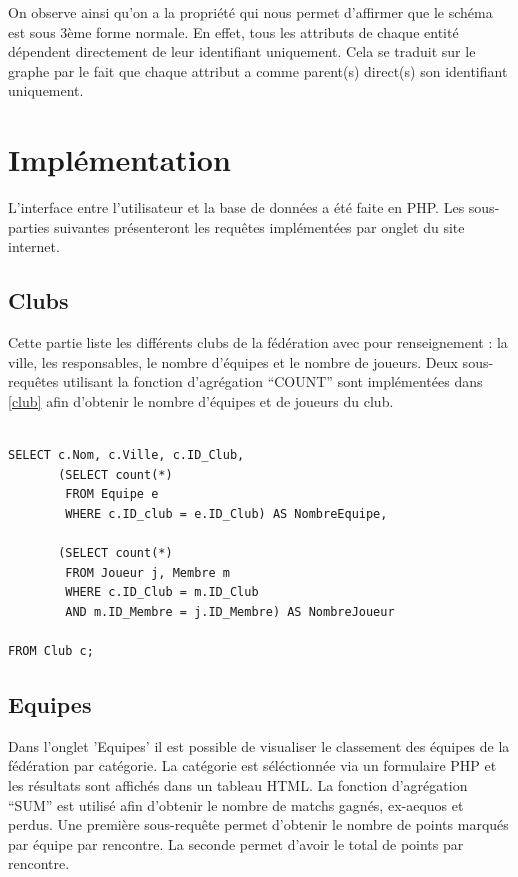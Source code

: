 \documentclass[a4paper»,8pt,french,fleqn]{report}
\begin{document}
On observe ainsi qu'on a la propriété qui nous permet d'affirmer que le schéma est sous 3ème forme normale. En effet, tous les attributs de chaque entité dépendent directement de leur identifiant uniquement. Cela se traduit sur le graphe par le fait que chaque attribut a comme parent(s) direct(s) son identifiant uniquement.

\chapter{Implémentation}

L'interface entre l'utilisateur et la base de données a été faite en PHP. Les sous-parties suivantes présenteront les requêtes implémentées par onglet du site internet.

\section{Clubs}

Cette partie liste les différents clubs de la fédération avec pour renseignement : la ville, les responsables, le nombre d'équipes et le nombre de joueurs. Deux sous-requêtes utilisant la fonction d'agrégation ``COUNT'' sont implémentées dans \ref{club} afin d'obtenir le nombre d'équipes et de joueurs du club. 

\begin{lstlisting}

SELECT c.Nom, c.Ville, c.ID_Club,
       (SELECT count(*) 
        FROM Equipe e
        WHERE c.ID_club = e.ID_Club) AS NombreEquipe,

       (SELECT count(*) 
        FROM Joueur j, Membre m
        WHERE c.ID_Club = m.ID_Club
        AND m.ID_Membre = j.ID_Membre) AS NombreJoueur

FROM Club c;

\end{lstlisting}

\section{Equipes}

Dans l'onglet 'Equipes' il est possible de visualiser le classement des équipes de la fédération par catégorie. La catégorie est séléctionnée via un formulaire PHP et les résultats sont affichés dans un tableau HTML. La fonction d'agrégation ``SUM'' est utilisé afin d'obtenir le nombre de matchs gagnés, ex-aequos et perdus. Une première sous-requête permet d'obtenir le nombre de points marqués par équipe par rencontre. La seconde permet d'avoir le total de points par rencontre. 
\end{document}
